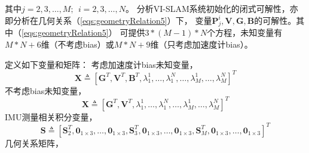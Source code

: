 \documentclass{article}
\begin{document}
其中$j=2,3,\dots,M;\ \ i=2,3,\dots,N$。
分析VI-SLAM系统初始化的闭式可解性，亦即分析在几何关系（\ref{eqs:geometryRelation5}）下，
变量$\textbf{P}^i_j,\textbf{V},\textbf{G},\textbf{B}$的可解性。其中（\ref{eqs:geometryRelation5}）
可提供$3*(M-1)*N$个方程，未知变量有$M*N+6$维（不考虑bias）或$M*N+9$维（只考虑加速度计bias）。
\par
定义如下变量和矩阵：
考虑加速度计bias未知变量，
\begin{equation}
    \textbf{X}\triangleq\left[\textbf{G}^T,\textbf{V}^T,\textbf{B}^T,\lambda_1^1,\dots,\lambda_1^N,
    \dots,\lambda_M^1,\dots,\lambda_M^N\right]^T
\end{equation}
不考虑bias未知变量，
\begin{equation}
    \textbf{X}\triangleq\left[\textbf{G}^T,\textbf{V}^T,\lambda_1^1,\dots,\lambda_1^N,
    \dots,\lambda_M^1,\dots,\lambda_M^N\right]^T
\end{equation}
IMU测量相关积分变量，
\begin{equation}
    \textbf{S}\triangleq \left[\textbf{S}_2^T,\textbf{0}_{1\times3},\dots,\textbf{0}_{1\times 3},
    \textbf{S}_3^T,\textbf{0}_{1\times3},\dots,\textbf{0}_{1\times 3},
    \textbf{S}_M^T,\textbf{0}_{1\times3},\dots,\textbf{0}_{1\times 3}\right]^T
\end{equation}
几何关系矩阵，
\end{document}
